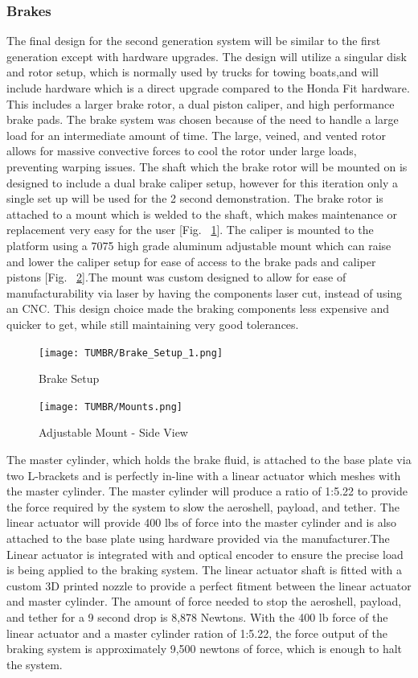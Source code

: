 \subsubsection{Brakes}

\indent\indent The final design for the second generation system will be similar to the first generation except with hardware upgrades. The design will utilize a singular disk and rotor setup, which is normally used by trucks for towing boats,and will include hardware which is a direct upgrade compared to the Honda Fit hardware. This includes a larger brake rotor, a dual piston caliper, and high performance brake pads. The brake system was chosen because of the need to handle a large load for an intermediate amount of time. The large, veined, and vented rotor allows for massive convective forces to cool the rotor under large loads, preventing warping issues. The shaft which the brake rotor will be mounted on is designed to include a dual brake caliper setup, however for this iteration only a single set up will be used for the 2 second demonstration. The brake rotor is attached to a mount which is welded to the shaft, which makes maintenance or replacement very easy for the user [Fig. ~\ref{fig:Mount3}]. The caliper is mounted to the platform using a 7075 high grade aluminum adjustable mount which can raise and lower the caliper setup for ease of access to the brake pads and caliper pistons  [Fig. ~\ref{fig:Mount2}].The mount was custom designed to allow for ease of manufacturability via laser by having the components laser cut, instead of using an CNC. This design choice made the braking components less expensive and quicker to get, while still maintaining very good tolerances. 

\begin{figure}[H]
  \centering
  \texttt{[image: TUMBR/Brake\_Setup\_1.png]}
  \caption{\label{fig:Mount3}Brake Setup}
\end{figure}

\begin{figure}[H]
  \centering
  \texttt{[image: TUMBR/Mounts.png]}
  \caption{\label{fig:Mount2}Adjustable Mount - Side View}
\end{figure}

The master cylinder, which holds the brake fluid, is attached to the base plate via two L-brackets and is perfectly in-line with a linear actuator which meshes with the master cylinder. The master cylinder will produce a ratio of 1:5.22 to provide the force required by the system to slow the aeroshell, payload, and tether. The linear actuator will provide 400 lbs of force into the master cylinder and is also attached to the base plate using hardware provided via the manufacturer.The Linear actuator is integrated with and optical encoder to ensure the precise load is being applied to the braking system. The linear actuator shaft is fitted with a custom 3D printed nozzle to provide a perfect fitment between the linear actuator and master cylinder. The amount of force needed to stop the aeroshell, payload, and tether for a 9 second drop is 8,878 Newtons. With the 400 lb force of the linear actuator and a master cylinder ration of 1:5.22, the force output of the braking system is approximately 9,500 newtons of force, which is enough to halt the system.


